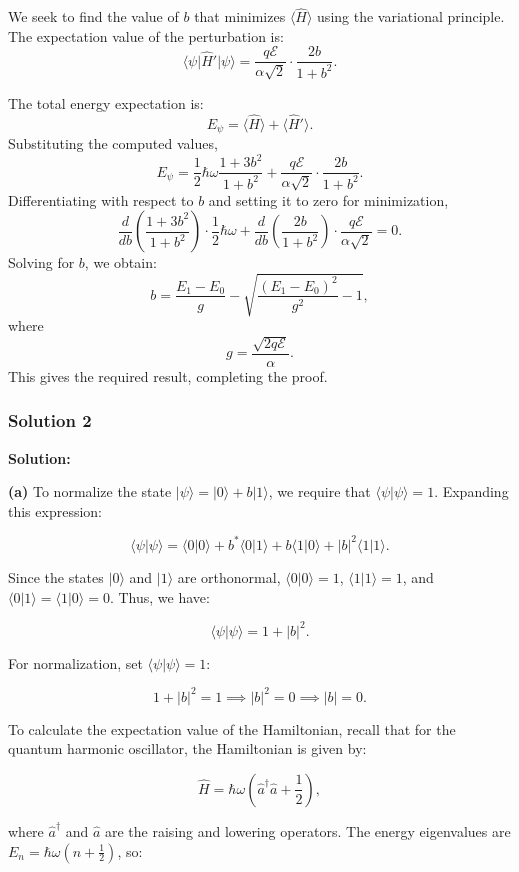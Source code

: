\documentclass{article}
\begin{document}
We seek to find the value of \( b \) that minimizes \( \langle \hat{H} \rangle \) using the variational principle. The expectation value of the perturbation is:
\[
\langle \psi \vert \hat{H}' \vert \psi \rangle = \frac{q\mathcal{E}}{\alpha \sqrt{2}} \cdot \frac{2b}{1 + b^2}.
\]

The total energy expectation is:
\[
E_{\psi} = \langle \hat{H} \rangle + \langle \hat{H}' \rangle.
\]
Substituting the computed values,
\[
E_{\psi} = \frac{1}{2} \hbar \omega \frac{1 + 3b^2}{1 + b^2} + \frac{q\mathcal{E}}{\alpha \sqrt{2}} \cdot \frac{2b}{1 + b^2}.
\]
Differentiating with respect to \( b \) and setting it to zero for minimization,
\[
\frac{d}{db} \left( \frac{1 + 3b^2}{1 + b^2} \right) \cdot \frac{1}{2} \hbar \omega + \frac{d}{db} \left( \frac{2b}{1 + b^2} \right) \cdot \frac{q\mathcal{E}}{\alpha \sqrt{2}} = 0.
\]
Solving for \( b \), we obtain:
\[
 b = \frac{E_1 - E_0}{g} - \sqrt{\frac{(E_1 - E_0)^2}{g^2} - 1},
\]
where
\[
 g = \frac{\sqrt{2q\mathcal{E}}}{\alpha}.
\]
This gives the required result, completing the proof.

\subsubsection{Solution 2}
\textbf{Solution:}

\textbf{(a)} To normalize the state \(|\psi\rangle = |0\rangle + b|1\rangle\), we require that \(\langle \psi | \psi \rangle = 1\). Expanding this expression:

\[
\langle \psi | \psi \rangle = \langle 0 | 0 \rangle + b^* \langle 0 | 1 \rangle + b \langle 1 | 0 \rangle + |b|^2 \langle 1 | 1 \rangle.
\]

Since the states \(|0\rangle\) and \(|1\rangle\) are orthonormal, \(\langle 0 | 0 \rangle = 1\), \(\langle 1 | 1 \rangle = 1\), and \(\langle 0 | 1 \rangle = \langle 1 | 0 \rangle = 0\). Thus, we have:

\[
\langle \psi | \psi \rangle = 1 + |b|^2.
\]

For normalization, set \(\langle \psi | \psi \rangle = 1\):

\[
1 + |b|^2 = 1 \implies |b|^2 = 0 \implies |b| = 0.
\]

To calculate the expectation value of the Hamiltonian, recall that for the quantum harmonic oscillator, the Hamiltonian is given by:

\[
\hat{H} = \hbar \omega \left( \hat{a}^\dagger \hat{a} + \frac{1}{2} \right),
\]

where \(\hat{a}^\dagger\) and \(\hat{a}\) are the raising and lowering operators. The energy eigenvalues are \(E_n = \hbar \omega \left( n + \frac{1}{2} \right)\), so:
\end{document}
